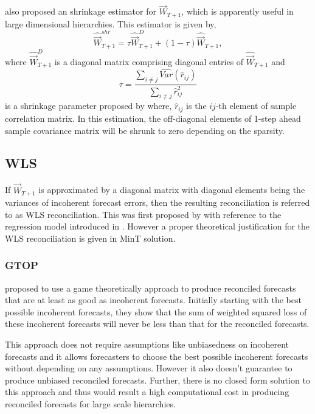 \documentclass[graybox]{svmult}
\begin{document}
\cite{Wickramasuriya2018} also proposed an shrinkage estimator for ${\vec{W}}_{T+1}$, which is apparently useful in large dimensional hierarchies. This estimator is given by,
\begin{equation} \label{eq:26}
\hat{{\vec{W}}}_{T+1}^{shr} = \tau\hat{{\vec{W}}}_{T+1}^D + (1-\tau)\hat{{\vec{W}}}_{T+1},
\end{equation}
where $\hat{{\vec{W}}}_{T+1}^D$ is a diagonal matrix comprising diagonal entries of $\hat{{\vec{W}}}_{T+1}$ and 
$$\tau = \frac{\sum_{i \ne j}\hat{Var}(\hat{r}_{ij})}{\sum_{i \ne j}\hat{r}_{ij}^2}$$ is a shrinkage parameter proposed by \citet{schafer2005} where, $\hat{r}_{ij}$ is the $ij$-th element of sample correlation matrix.  In this estimation, the off-diagonal elements of 1-step ahead sample covariance matrix will be shrunk to zero depending on the sparsity.

\subsection{WLS}

If ${\vec{W}}_{T+1}$ is approximated by a diagonal matrix with diagonal elements being the variances of incoherent forecast errors, then the resulting reconciliation is referred to as WLS reconciliation. This was first proposed by \cite{Hyndman2016} with reference to the regression model introduced in \cite{hyndman2011}. However a proper theoretical justification for the WLS reconciliation is given in MinT solution.

\subsubsection{GTOP}

\cite{VanErven2015a} proposed to use a game theoretically approach to produce reconciled forecasts that are at least as good as incoherent forecasts. Initially starting with the best possible incoherent forecasts, they show that the sum of weighted squared loss of these incoherent forecasts will never be less than that for the reconciled forecasts.
 
This approach does not require assumptions like unbiasedness on incoherent forecasts and it allows forecasters to choose the best possible incoherent forecasts without depending on any assumptions. However it also doesn't guarantee to produce unbiased reconciled forecasts. Further, there is no closed form solution to this approach and thus would result a high computational cost in producing reconciled forecasts for large scale hierarchies. 
\end{document}
